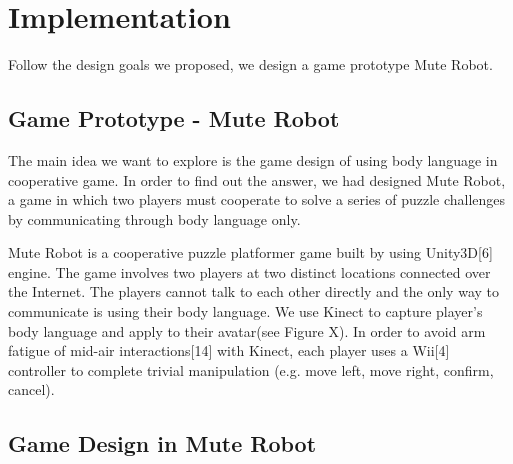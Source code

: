 \documentclass{sigchi}
\begin{document}
\section{Implementation}

Follow the design goals we proposed, we design a game prototype Mute Robot.

\subsection{Game Prototype - Mute Robot}

The main idea we want to explore is the game design of using body language in cooperative game. In order to find out the answer, we had designed Mute Robot, a game in which two players must cooperate to solve a series of puzzle challenges by communicating through body language only.

Mute Robot is a cooperative puzzle platformer game built by using Unity3D[6] engine. The game involves two players at two distinct locations connected over the Internet. The players cannot talk to each other directly and the only way to communicate is using their body language. We use Kinect to capture player’s body language and apply to their avatar(see Figure X). In order to avoid arm fatigue of mid-air interactions[14] with Kinect, each player uses a Wii[4] controller to complete trivial manipulation (e.g. move left, move right, confirm, cancel).  

\subsection{Game Design in Mute Robot}
\end{document}
